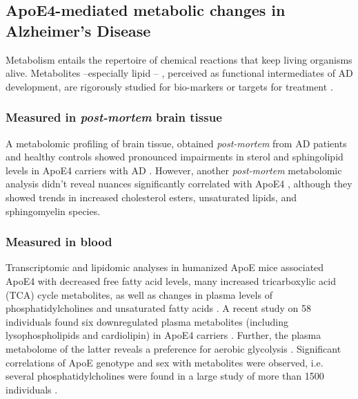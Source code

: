 \documentclass{amsart}
\theoremstyle{plain}
\begin{document}
\subsection{ApoE4-mediated metabolic changes in Alzheimer's Disease}
Metabolism entails the repertoire of chemical reactions that keep living organisms alive. Metabolites  --especially lipid \cite{Barupal2019SetsPathophysiology,Fernandez-Calle2022APOEDiseases, Proitsi2017AssociationAnalysis}-- , perceived as functional intermediates of AD development, are rigorously studied for bio-markers or targets for treatment \cite{Oeckl2019GlialImpairment}.
 
\subsubsection{Measured in \textit{post-mortem} brain tissue}A metabolomic profiling of brain tissue, obtained \textit{post-mortem} from AD patients and healthy controls showed  pronounced impairments in sterol and sphingolipid levels in ApoE4 carriers with AD  \cite{Bandaru2009ApoE4Brain}. However, another \textit{post-mortem} metabolomic analysis didn't reveal nuances significantly correlated with ApoE4 \cite{Novotny2023MetabolomicBrains}, although they showed trends in increased cholesterol esters, unsaturated lipids, and sphingomyelin species.

\subsubsection{Measured in blood}
Transcriptomic and lipidomic analyses in humanized ApoE mice associated ApoE4 with decreased free fatty acid levels, many increased  tricarboxylic acid (TCA) cycle metabolites, as well as changes in plasma levels of phosphatidylcholines and unsaturated fatty acids \cite{Area-Gomez2020APOE4Mice, Zhao2020AlzheimersPathways}. A recent study on 58 individuals found six downregulated plasma metabolites (including lysophospholipids and cardiolipin) in ApoE4 carriers \cite{pena-bautista2020MetabolomicsEffect}. Further, the plasma metabolome of the latter reveals a preference for aerobic glycolysis \cite{Farmer2021APO4Glycolysis}. Significant correlations of ApoE genotype and sex with metabolites were observed, i.e. several phosphatidylcholines were found in a large study of more than 1500 individuals \cite{Arnold2020SexMetabolome}.
\end{document}
